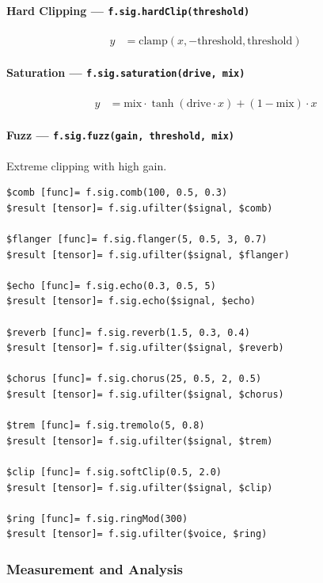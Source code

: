 \paragraph{Hard Clipping --- \texttt{f.sig.hardClip(threshold)}}

\begin{align}
y &= \text{clamp}(x, -\text{threshold}, \text{threshold}) \label{eq:sig-hardclip}
\end{align}

\paragraph{Saturation --- \texttt{f.sig.saturation(drive, mix)}}

\begin{align}
y &= \text{mix} \cdot \tanh(\text{drive} \cdot x) + (1 - \text{mix}) \cdot x \label{eq:sig-saturation}
\end{align}

\paragraph{Fuzz --- \texttt{f.sig.fuzz(gain, threshold, mix)}}
Extreme clipping with high gain.

\begin{verbatim}
$comb [func]= f.sig.comb(100, 0.5, 0.3)
$result [tensor]= f.sig.ufilter($signal, $comb)

$flanger [func]= f.sig.flanger(5, 0.5, 3, 0.7)
$result [tensor]= f.sig.ufilter($signal, $flanger)

$echo [func]= f.sig.echo(0.3, 0.5, 5)
$result [tensor]= f.sig.echo($signal, $echo)

$reverb [func]= f.sig.reverb(1.5, 0.3, 0.4)
$result [tensor]= f.sig.ufilter($signal, $reverb)

$chorus [func]= f.sig.chorus(25, 0.5, 2, 0.5)
$result [tensor]= f.sig.ufilter($signal, $chorus)

$trem [func]= f.sig.tremolo(5, 0.8)
$result [tensor]= f.sig.ufilter($signal, $trem)

$clip [func]= f.sig.softClip(0.5, 2.0)
$result [tensor]= f.sig.ufilter($signal, $clip)

$ring [func]= f.sig.ringMod(300)
$result [tensor]= f.sig.ufilter($voice, $ring)
\end{verbatim}

\subsubsection{Measurement and Analysis}

